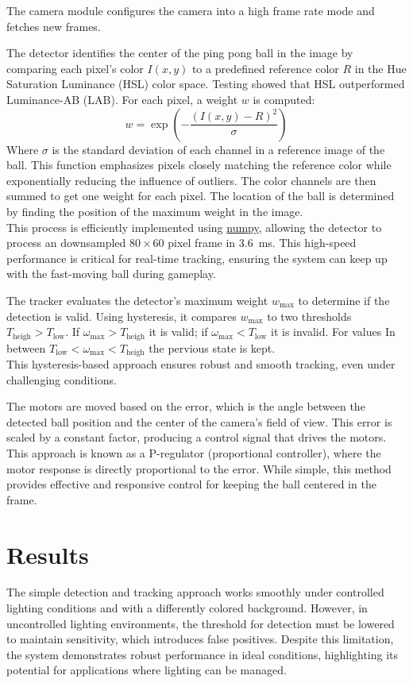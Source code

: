 \documentclass[
    parskip=half, 
    twoside=false,
    twocolumn=true,
    fontsize=12pt,
]{scrarticle}
\begin{document}
The camera module configures the camera into a high frame rate mode and fetches new frames.

The detector identifies the center of the ping pong ball in the image by comparing each pixel's color $I(x,y)$ to a predefined reference color $R$ in the Hue Saturation Luminance (HSL) color space.
Testing showed that HSL outperformed Luminance-AB (LAB).
For each pixel, a weight $w$ is computed:
$$w = \exp\left(- \frac{(I(x,y)-R)^2}{\sigma}\right)$$
Where $\sigma$ is the standard deviation of each channel in a reference image of the ball.
This function emphasizes pixels closely matching the reference color while exponentially reducing the influence of outliers.
The color channels are then summed to get one weight for each pixel.
The location of the ball is determined by finding the position of the maximum weight in the image.\\
This process is efficiently implemented using \href{https://numpy.org/}{numpy}, allowing the detector to process an downsampled $80\times 60$ pixel frame in \SI{3.6}{ms}.
This high-speed performance is critical for real-time tracking, ensuring the system can keep up with the fast-moving ball during gameplay.

The tracker evaluates the detector's maximum weight $w_\text{max}$ to determine if the detection is valid.
Using hysteresis, it compares $w_\text{max}$ to two thresholds $T_\text{heigh} > T_\text{low}$.
If $\omega_\text{max}>T_\text{heigh}$ it is valid; if $\omega_\text{max}<T_\text{low}$ it is invalid.
For values In between $T_\text{low}<\omega_\text{max}<T_\text{heigh}$ the pervious state is kept.\\
This hysteresis-based approach ensures robust and smooth tracking, even under challenging conditions. 

The motors are moved based on the error, which is the angle between the detected ball position and the center of the camera's field of view. This error is scaled by a constant factor, producing a control signal that drives the motors. This approach is known as a P-regulator (proportional controller), where the motor response is directly proportional to the error. While simple, this method provides effective and responsive control for keeping the ball centered in the frame.

\section{Results}
The simple detection and tracking approach works smoothly under controlled lighting conditions and with a differently colored background. However, in uncontrolled lighting environments, the threshold for detection must be lowered to maintain sensitivity, which introduces false positives. Despite this limitation, the system demonstrates robust performance in ideal conditions, highlighting its potential for applications where lighting can be managed.
\end{document}
